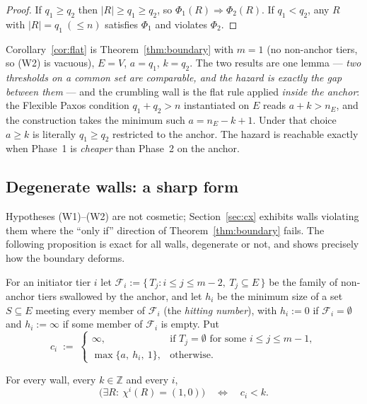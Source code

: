 \begin{proof}
If $q_1\ge q_2$ then $|R|\ge q_1\ge q_2$, so $\Phi_1(R)\Rightarrow\Phi_2(R)$.
If $q_1<q_2$, any $R$ with $|R|=q_1\ (\le n)$ satisfies $\Phi_1$ and violates
$\Phi_2$.
\end{proof}

Corollary~\ref{cor:flat} is Theorem~\ref{thm:boundary} with $m=1$ (no
non-anchor tiers, so (W2) is vacuous), $E=V$, $a=q_1$, $k=q_2$.  The two
results are one lemma --- \emph{two thresholds on a common set are
comparable, and the hazard is exactly the gap between them} --- and the
crumbling wall is the flat rule applied \emph{inside the anchor}: the
Flexible Paxos condition $q_1+q_2>n$ instantiated on $E$ reads
$a+k>n_E$, and the construction takes the minimum such $a=n_E-k+1$.  Under
that choice $a\ge k$ is literally $q_1\ge q_2$ restricted to the anchor.
The hazard is reachable exactly when Phase~1 is \emph{cheaper} than Phase~2
on the anchor.

\subsection{Degenerate walls: a sharp form}

Hypotheses (W1)--(W2) are not cosmetic; Section~\ref{sec:cx} exhibits walls
violating them where the ``only if'' direction of
Theorem~\ref{thm:boundary} fails.  The following proposition is exact for all
walls, degenerate or not, and shows precisely how the boundary deforms.

\begin{definition}
For an initiator tier $i$ let
$\mathcal F_i:=\{\,T_j : i\le j\le m-2,\ T_j\subseteq E\,\}$ be the family of
non-anchor tiers swallowed by the anchor, and let $h_i$ be the minimum size of
a set $S\subseteq E$ meeting every member of $\mathcal F_i$ (the
\emph{hitting number}), with $h_i:=0$ if $\mathcal F_i=\emptyset$ and
$h_i:=\infty$ if some member of $\mathcal F_i$ is empty.  Put
\[
  c_i \;:=\;
  \begin{cases}
    \infty, & \text{if } T_j=\emptyset \text{ for some } i\le j\le m-1,\\
    \max\{a,\ h_i,\ 1\}, & \text{otherwise.}
  \end{cases}
\]
\end{definition}

\begin{proposition}
\label{prop:sharp}
For every wall, every $k\in\mathbb Z$ and every $i$,
\[
  \bigl(\exists R:\ \chi^i(R)=(1,0)\bigr)
  \quad\Longleftrightarrow\quad
  c_i<k .
\]
\end{proposition}

